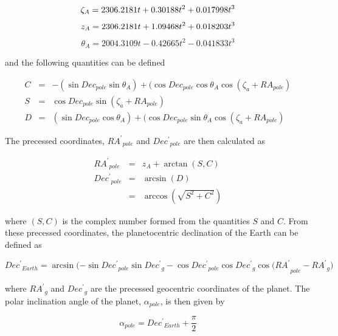 \documentclass[11pt,twoside]{article}
\renewcommand{\_}{\texttt{\symbol{95}}}
\begin{document}
\begin{displaymath}
\zeta_A = 2306.2181 t + 0.30188 {t^2} + 0.017998 {t^3}\\
\end{displaymath}
\begin{displaymath}
z_A = 2306.2181 t + 1.09468 {t^2} + 0.018203 {t^3}\\
\end{displaymath}
\begin{displaymath}
\theta_A = 2004.3109 t - 0.42665 {t^2} - 0.041833 {t^3}
\end{displaymath}

and the following quantities can be defined

\begin{eqnarray*}
C & = & -(\sin Dec_{pole} \sin \theta_A) + (\cos Dec_{pole} \cos \theta_A \cos (\zeta_a + RA_{pole})\\
S & = & \cos Dec_{pole} \sin (\zeta_a + RA_{pole})\\
D & = & (\sin Dec_{pole} \cos \theta_A) + (\cos Dec_{pole} \sin \theta_A \cos (\zeta_a + RA_{pole})
\end{eqnarray*}

The precessed coordinates, ${RA^\prime}_{pole}$ and ${Dec^\prime}_{pole}$ are then calculated as

\begin{eqnarray*}
{RA^\prime}_{pole} & = & z_A + \arctan(S,C)\\
{Dec^\prime}_{pole} & = & \arcsin (D)\\
& = & \arccos (\sqrt{ S^2 + C^2})
\end{eqnarray*}

where $(S,C)$ is the complex number formed from the quantities $S$ and $C$.  From these precessed coordinates, the planetocentric declination of the Earth can be defined as

\begin{displaymath}
{Dec^\prime}_{Earth} = \arcsin {(-\sin {Dec^\prime}_{pole} \sin {Dec^\prime}_g - \cos {Dec^\prime}_{pole} \cos {Dec^\prime}_g \cos (RA^\prime}_{pole} - {RA^\prime}_g)
\end{displaymath}

where ${RA^\prime}_g$ and ${Dec^\prime}_g$ are the precessed geocentric coordinates of the planet.  The polar inclination angle of the planet, $\alpha_{pole}$,  is then given by

\begin{displaymath}
\alpha_{pole} = {Dec^\prime}_{Earth} + \frac{\pi}{2}
\end{displaymath}
\end{document}
